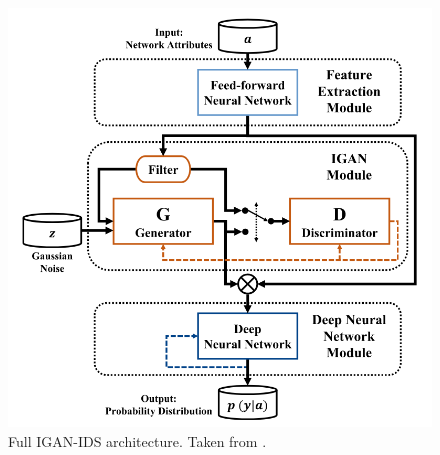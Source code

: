 \begin{figure}[]
\centering
\includegraphics[scale=0.5]{figures/igan_ids_arch.png}
\caption[IGAN-IDS Architecture]{Full IGAN-IDS architecture. Taken from \cite{huang.etal_IGAN_2020}.}
\label{fig:igan_ids}
\end{figure}


